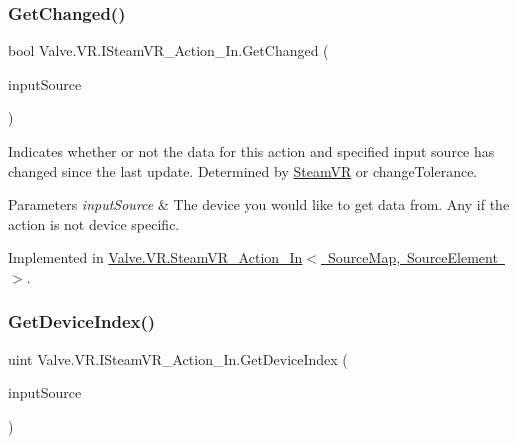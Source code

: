 \subsubsection{\texorpdfstring{GetChanged()}{GetChanged()}}
{\footnotesize\ttfamily bool Valve.\+V\+R.\+I\+Steam\+V\+R\+\_\+\+Action\+\_\+\+In.\+Get\+Changed (\begin{DoxyParamCaption}\item[{\mbox{\hyperlink{namespace_valve_1_1_v_r_a82e5bf501cc3aa155444ee3f0662853f}{Steam\+V\+R\+\_\+\+Input\+\_\+\+Sources}}}]{input\+Source }\end{DoxyParamCaption})}



Indicates whether or not the data for this action and specified input source has changed since the last update. Determined by \mbox{\hyperlink{class_valve_1_1_v_r_1_1_steam_v_r}{Steam\+VR}} or \textquotesingle{}change\+Tolerance\textquotesingle{}. 


\begin{DoxyParams}{Parameters}
{\em input\+Source} & The device you would like to get data from. Any if the action is not device specific.\\
\hline
\end{DoxyParams}


Implemented in \mbox{\hyperlink{class_valve_1_1_v_r_1_1_steam_v_r___action___in_ab5dff6e847415ea70581fb544443738d}{Valve.\+V\+R.\+Steam\+V\+R\+\_\+\+Action\+\_\+\+In$<$ Source\+Map, Source\+Element $>$}}.

\mbox{\label{interface_valve_1_1_v_r_1_1_i_steam_v_r___action___in_ab21c1d79f19d11a4d3ee53d373c62cb4}} 
\subsubsection{\texorpdfstring{GetDeviceIndex()}{GetDeviceIndex()}}
{\footnotesize\ttfamily uint Valve.\+V\+R.\+I\+Steam\+V\+R\+\_\+\+Action\+\_\+\+In.\+Get\+Device\+Index (\begin{DoxyParamCaption}\item[{\mbox{\hyperlink{namespace_valve_1_1_v_r_a82e5bf501cc3aa155444ee3f0662853f}{Steam\+V\+R\+\_\+\+Input\+\_\+\+Sources}}}]{input\+Source }\end{DoxyParamCaption})}



